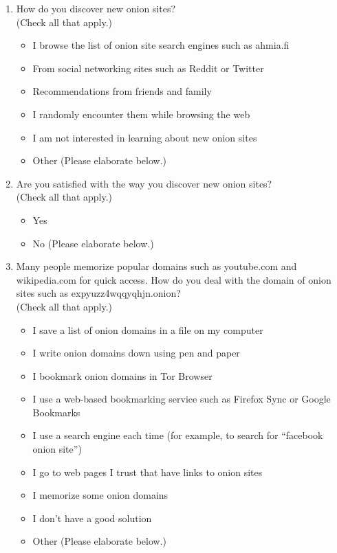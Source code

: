 \begin{enumerate}
    \item How do you discover new onion sites?\\(Check all that apply.)
        \begin{itemize}[label=$\Square$]
            \item I browse the list of onion site search engines such as
                ahmia.fi
            \item From social networking sites such as Reddit or Twitter
            \item Recommendations from friends and family
            \item I randomly encounter them while browsing the web
            \item I am not interested in learning about new onion sites
            \item Other (Please elaborate below.)
        \end{itemize}

    \item Are you satisfied with the way you discover new onion sites?\\(Check
        all that apply.)
        \begin{itemize}[label=$\Circle$]
            \item Yes
            \item No (Please elaborate below.)
        \end{itemize}

    \item Many people memorize popular domains such as youtube.com and
        wikipedia.com for quick access. How do you deal with the domain of
        onion sites such as expyuzz4wqqyqhjn.onion?\\(Check all that apply.)
        \begin{itemize}[label=$\Square$]
            \item I save a list of onion domains in a file on my computer
            \item I write onion domains down using pen and paper
            \item I bookmark onion domains in Tor Browser
            \item I use a web-based bookmarking service such as Firefox Sync or
                Google Bookmarks
            \item I use a search engine each time (for example, to search for
                ``facebook onion site'')
            \item I go to web pages I trust that have links to onion sites
            \item I memorize some onion domains
            \item I don't have a good solution
            \item Other (Please elaborate below.)
        \end{itemize}


\end{enumerate}
